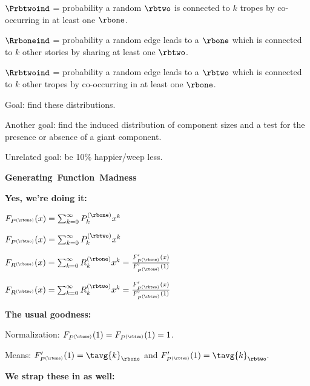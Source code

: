       $\Prbtwoind$ = probability a random $\rbtwo$ is connected
      to $k$ tropes by co-occurring in at least one $\rbone$.
     
      $\Rrboneind$ = probability a random edge leads to a $\rbone$
      which is connected
      to $k$ other stories by sharing at least one $\rbtwo$.
     
      $\Rrbtwoind$ = probability a random edge leads to a $\rbtwo$ 
      which is connected
      to $k$ other tropes by co-occurring in at least one $\rbone$.
     
      Goal: find these distributions.
     
      Another goal: find the induced distribution of component sizes
      and a test for the presence or absence of a giant component.
     
      Unrelated goal: be 10\% happier/weep less.
    
  



  \textbf{Generating\ Function\ Madness}

  \textbf{Yes, we're doing it:}
    
     
      $
      F_{P^{(\rbone)}}(x)
      =
      \sum_{k=0}^{\infty}
      P^{(\rbone)}_{k} x^k
      $
     
      $
      F_{P^{(\rbtwo)}}(x)
      =
      \sum_{k=0}^{\infty}
      P^{(\rbtwo)}_{k} x^k
      $
     
      $
      F_{R^{(\rbone)}}(x)
      =
      \sum_{k=0}^{\infty}
      R^{(\rbone)}_{k} x^k
      =
      \frac{
        F'_{P^{(\rbone)}}(x)
      }
      {
        F'_{P^{(\rbone)}}(1)
      }
      $
     
      $
      F_{R^{(\rbtwo)}}(x)
      =
      \sum_{k=0}^{\infty}
      R^{(\rbtwo)}_{k} x^k
      =
      \frac{
        F'_{P^{(\rbtwo)}}(x)
      }
      {
        F'_{P^{(\rbtwo)}}(1)
      }
      $
    
  

  \textbf{The usual goodness:}
    
     
      Normalization:
      $
      F_{P^{(\rbone)}}(1) 
      =
      F_{P^{(\rbtwo)}}(1) 
      =
      1
      $.
    
      Means:
      $
      F'_{P^{(\rbone)}}(1)
      =
      \tavg{k}_{\rbone}
      $
      and
      $
      F'_{P^{(\rbtwo)}}(1)
      =
      \tavg{k}_{\rbtwo}.
      $
    
  



  \textbf{We strap these in as well:}
    
